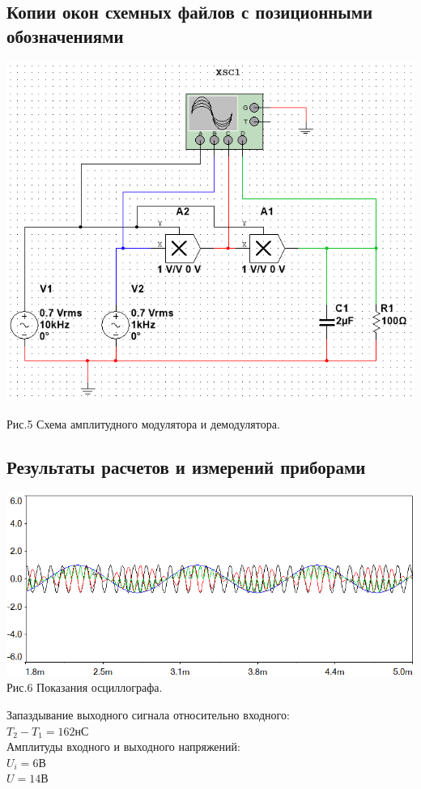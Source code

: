 \documentclass[11pt]{article}
\begin{document}
\subsection{Копии окон схемных файлов с позиционными обозначениями}
\includegraphics[width=1\linewidth]{img/second.png}
\begin{center}
    Рис.5 Схема амплитудного модулятора и демодулятора.
\end{center}

\subsection{Результаты расчетов и измерений приборами}
\begin{center}
    \includegraphics[width=1\linewidth]{img/second1.png}
        Рис.6 Показания осциллографа.
\end{center}
    Запаздывание выходного сигнала относительно входного:\\
    $T_2 - T_1 = 162$нС\\
    Амплитуды входного и выходного напряжений:\\
    $U_i = 6$В\\
    $U = 14$В    
\newpage
\end{document}
